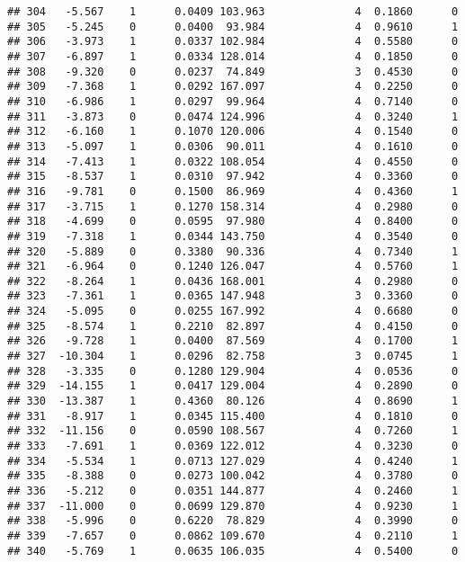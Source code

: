 \documentclass[
]{article}
\begin{document}
\begin{verbatim}
## 304   -5.567    1      0.0409 103.963              4  0.1860      0
## 305   -5.245    0      0.0400  93.984              4  0.9610      1
## 306   -3.973    1      0.0337 102.984              4  0.5580      0
## 307   -6.897    1      0.0334 128.014              4  0.1850      0
## 308   -9.320    0      0.0237  74.849              3  0.4530      0
## 309   -7.368    1      0.0292 167.097              4  0.2250      0
## 310   -6.986    1      0.0297  99.964              4  0.7140      0
## 311   -3.873    0      0.0474 124.996              4  0.3240      1
## 312   -6.160    1      0.1070 120.006              4  0.1540      0
## 313   -5.097    1      0.0306  90.011              4  0.1610      0
## 314   -7.413    1      0.0322 108.054              4  0.4550      0
## 315   -8.537    1      0.0310  97.942              4  0.3360      0
## 316   -9.781    0      0.1500  86.969              4  0.4360      1
## 317   -3.715    1      0.1270 158.314              4  0.2980      0
## 318   -4.699    0      0.0595  97.980              4  0.8400      0
## 319   -7.318    1      0.0344 143.750              4  0.3540      0
## 320   -5.889    0      0.3380  90.336              4  0.7340      1
## 321   -6.964    0      0.1240 126.047              4  0.5760      1
## 322   -8.264    1      0.0436 168.001              4  0.2980      0
## 323   -7.361    1      0.0365 147.948              3  0.3360      0
## 324   -5.095    0      0.0255 167.992              4  0.6680      0
## 325   -8.574    1      0.2210  82.897              4  0.4150      0
## 326   -9.728    1      0.0400  87.569              4  0.1700      1
## 327  -10.304    1      0.0296  82.758              3  0.0745      1
## 328   -3.335    0      0.1280 129.904              4  0.0536      0
## 329  -14.155    1      0.0417 129.004              4  0.2890      0
## 330  -13.387    1      0.4360  80.126              4  0.8690      1
## 331   -8.917    1      0.0345 115.400              4  0.1810      0
## 332  -11.156    0      0.0590 108.567              4  0.7260      1
## 333   -7.691    1      0.0369 122.012              4  0.3230      0
## 334   -5.534    1      0.0713 127.029              4  0.4240      1
## 335   -8.388    0      0.0273 100.042              4  0.3780      0
## 336   -5.212    0      0.0351 144.877              4  0.2460      1
## 337  -11.000    0      0.0699 129.870              4  0.9230      1
## 338   -5.996    0      0.6220  78.829              4  0.3990      0
## 339   -7.657    0      0.0862 109.670              4  0.2110      1
## 340   -5.769    1      0.0635 106.035              4  0.5400      0

\end{verbatim}
\end{document}

